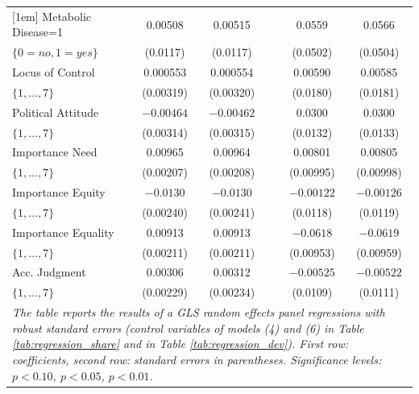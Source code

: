 \documentclass[smallcondensed]{svjour3}
\begin{document}
\begin{table}[ht]
{{\begin{tabularx}{13.5cm}{lccccc}
   [1em]
   Metabolic Disease=1      &   0.00508                &   0.00515                 &   &   0.0559                  &   0.0566                  \\
   $\{0=no,1=yes\}$         &  (0.0117)                &  (0.0117)                 &   &  (0.0502)                 &  (0.0504)                 \\
   [1em]
   Locus of Control         &   0.000553               &   0.000554                &   &   0.00590                 &   0.00585                 \\
   $\{1,\ldots,7\}$         &  (0.00319)               &  (0.00320)                &   &  (0.0180)                 &  (0.0181)                 \\
   [1em]
   Political Attitude       & $-0.00464$               & $-0.00462$                &   &   0.0300\sym{**}          &   0.0300\sym{**}          \\
   $\{1,\ldots,7\}$         &  (0.00314)               &  (0.00315)                &   &  (0.0132)                 &  (0.0133)                 \\
   [1em]
   Importance Need          &   0.00965\sym{***}       &   0.00964\sym{***}        &   &   0.00801                 &   0.00805                 \\
   $\{1,\ldots,7\}$         &  (0.00207)               &  (0.00208)                &   &  (0.00995)                &  (0.00998)                \\
   [1em]
   Importance Equity        & $-0.0130$\sym{***}       & $-0.0130$\sym{***}        &   & $-0.00122$                & $-0.00126$                \\
   $\{1,\ldots,7\}$         &  (0.00240)               &  (0.00241)                &   &  (0.0118)                 &  (0.0119)                 \\
   [1em]
   Importance Equality      &   0.00913\sym{***}       &   0.00913\sym{***}        &   & $-0.0618$\sym{***}        & $-0.0619$\sym{***}        \\
   $\{1,\ldots,7\}$         &  (0.00211)               &  (0.00211)                &   &  (0.00953)                &  (0.00959)                \\
   [1em]
   Acc. Judgment            &   0.00306                &   0.00312                 &   & $-0.00525$                & $-0.00522$                \\
   $\{1,\ldots,7\}$         &  (0.00229)               &  (0.00234)                &   &  (0.0109)                 &  (0.0111)                 \\
   [1em]\hline
\multicolumn{6}{p{13cm}}{\footnotesize \textit{The table reports the results of a GLS random effects panel regressions with robust standard errors (control variables of models (4) and (6) in Table \ref{tab:regression_share} and in Table \ref{tab:regression_dev}). First row: coefficients, second row: standard errors in parentheses. Significance levels: \sym{*} \(p<0.10\), \sym{**} \(p<0.05\), \sym{***} \(p<0.01\).}}
\end{tabularx}
}}
\end{table}
\end{document}
